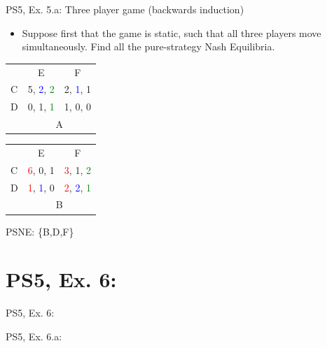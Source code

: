 \begin{frame}{PS5, Ex. 5.a: Three player game (backwards induction)}
    \begin{itemize}
      \item[(a)] Suppose first that the game is static, such that all three players move simultaneously. Find all the pure-strategy Nash Equilibria.
    \end{itemize}
    \begin{table}
      \begin{tabular}{l|c|c|}
        \multicolumn{1}{c}{} & \multicolumn{1}{c}{E} & \multicolumn{1}{c}{F} \\\cline{2-3}
        C & 5, \textcolor{blue}{2}, \textcolor{green}{2} & 2, \textcolor{blue}{1}, 1 \\\cline{2-3}
        D & 0, 1, \textcolor{green}{1} & 1, 0, 0 \\\cline{2-3}
        \multicolumn{1}{c}{} & \multicolumn{2}{c}{A}
      \end{tabular}\quad
      \begin{tabular}{l|c|c|}
        \multicolumn{1}{c}{} & \multicolumn{1}{c}{E} & \multicolumn{1}{c}{F} \\\cline{2-3}
        C & \textcolor{red}{6}, 0, 1 & \textcolor{red}{3}, 1, \textcolor{green}{2} \\\cline{2-3}
        D & \textcolor{red}{1}, \textcolor{blue}{1}, 0 & \textcolor{red}{2}, \textcolor{blue}{2}, \textcolor{green}{1} \\\cline{2-3}
        \multicolumn{1}{c}{} & \multicolumn{2}{c}{B}
      \end{tabular}
    \end{table}
  \vfill\null
  PSNE: \{B,D,F\}
\end{frame}



\section{PS5, Ex. 6: }

\begin{frame}{PS5, Ex. 6: }
  \begin{multicols}{2}
    \vfill\null \columnbreak
    \vfill\null
  \end{multicols}
\end{frame}

\begin{frame}{PS5, Ex. 6.a: }
  \begin{multicols}{2}
    \vfill\null \columnbreak
    \vfill\null
  \end{multicols}
\end{frame}




